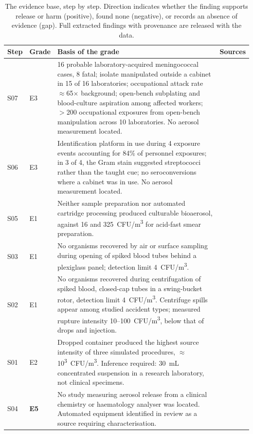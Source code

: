 \begin{table}[t]
\caption{The evidence base, step by step. Direction indicates whether the finding supports
release or harm (positive), found none (negative), or records an absence of evidence
(gap). Full extracted findings with provenance are released with the data.}
\label{tab:evidence}
\small
\begin{tabular}{@{}llp{}l@{}}
\toprule
\textbf{Step} & \textbf{Grade} & \textbf{Basis of the grade} & \textbf{Sources} \\
\midrule
S07 & E3 & 16 probable laboratory-acquired meningococcal cases, 8 fatal; isolate manipulated outside a cabinet in 15 of 16 laboratories; occupational attack rate $\approx$65$\times$ background; open-bench subplating and blood-culture aspiration among affected workers; $>$200 occupational exposures from open-bench manipulation across 10 laboratories. No aerosol measurement located. & \cite{sejvar2005,mmwr2002,mmwr2014,ackelsberg2020,bmbl6} \\
S06 & E3 & Identification platform in use during 4 exposure events accounting for 84\% of personnel exposures; in 3 of 4, the Gram stain suggested streptococci rather than the taught cue; no seroconversions where a cabinet was in use. No aerosol measurement located. & \cite{ackelsberg2020,asmbruc2025} \\
S05 & E1 & Neither sample preparation nor automated cartridge processing produced culturable bioaerosol, against 16 and 325~CFU/m\textsuperscript{3} for acid-fast smear preparation. & \cite{banada2010} \\
S03 & E1 & No organisms recovered by air or surface sampling during opening of spiked blood tubes behind a plexiglass panel; detection limit 4~CFU/m\textsuperscript{3}. & \cite{dubuis2021} \\
S02 & E1 & No organisms recovered during centrifugation of spiked blood, closed-cap tubes in a swing-bucket rotor, detection limit 4~CFU/m\textsuperscript{3}. Centrifuge spills appear among studied accident types; measured rupture intensity 10--100~CFU/m\textsuperscript{3}, below that of drops and injection. & \cite{dubuis2021,ravnholdt2025,liu2023} \\
S01 & E2 & Dropped container produced the highest source intensity of three simulated procedures, $\approx$10\textsuperscript{3}~CFU/m\textsuperscript{3}. Inference required: 30~mL concentrated suspension in a research laboratory, not clinical specimens. & \cite{liu2023,ravnholdt2025} \\
S04 & \textbf{E5} & No study measuring aerosol release from a clinical chemistry or haematology analyser was located. Automated equipment identified in review as a source requiring characterisation. & \cite{ravnholdt2025} \\
\bottomrule
\end{tabular}
\end{table}
